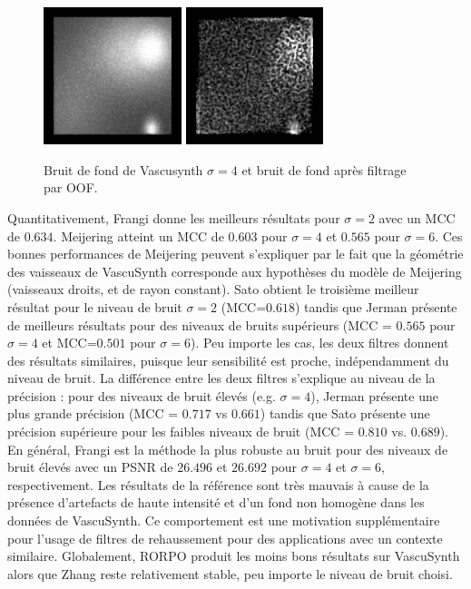 \begin{figure}[H]
  \centering
  \includegraphics[height=4cm]{Images/vascu_noise.png}
  \includegraphics[height=4cm]{Images/vascu_noise_OOF.png}
  \caption{Bruit de fond de Vascusynth $\sigma=4$ et bruit de fond après filtrage par OOF.}
  \label{fig:noisy_tubes}
\end{figure}

Quantitativement, Frangi donne les meilleurs résultats pour $\sigma=2$ avec un MCC de $0.634$. Meijering  atteint un MCC de $0.603$ pour $\sigma=4$ et $0.565$ pour $\sigma=6$. Ces bonnes performances de Meijering peuvent s'expliquer par le fait que la géométrie des vaisseaux de VascuSynth corresponde aux hypothèses du modèle de Meijering (vaisseaux droits, et de rayon constant). Sato obtient le troisième meilleur résultat pour le niveau de bruit $\sigma=2$ (MCC=$0.618$) tandis que Jerman présente de meilleurs résultats pour des niveaux de bruits supérieurs (MCC = $0.565$ pour $\sigma=4$ et MCC=$0.501$ pour $\sigma = 6$). Peu importe les cas, les deux filtres donnent des résultats similaires, puisque leur sensibilité est proche, indépendamment du niveau de bruit. La différence entre les deux filtres s'explique au niveau de la précision : pour des niveaux de bruit élevés (e.g. $\sigma=4$), Jerman présente une plus grande précision (MCC = $0.717$ vs $0.661$) tandis que Sato présente une précision supérieure pour les faibles niveaux de bruit (MCC = $0.810$ vs. $0.689$). En général, Frangi est la méthode la plus robuste au bruit pour des niveaux de bruit élevés avec un PSNR de $26.496$ et $26.692$ pour $\sigma=4$ et $\sigma=6$, respectivement. Les résultats de la référence sont très mauvais à cause de la présence d'artefacts de haute intensité et d'un fond non homogène dans les données de VascuSynth. Ce comportement est une motivation supplémentaire pour l'usage de filtres de rehaussement pour des applications avec un contexte similaire. Globalement, RORPO produit les moins bons résultats sur VascuSynth alors que Zhang reste relativement stable, peu importe le niveau de bruit choisi.

